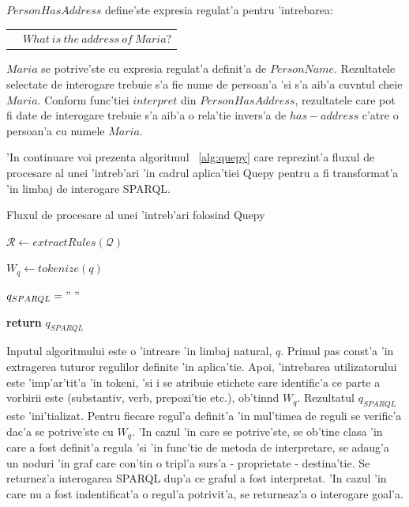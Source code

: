 \documentclass[12pt,a4paper,twoside]{report}
\begin{document}
$PersonHasAddress$ define'ste expresia regulat'a pentru 'intrebarea:

\begin{tabular}{ll}
 & $What\ is\ the\ address\ of\ Maria?$
\end{tabular}


$Maria$ se potrive'ste cu expresia regulat'a definit'a de $PersonName$. Rezultatele selectate de interogare trebuie s'a fie nume de persoan'a 'si s'a aib'a cuv\ia ntul cheie $Maria$. Conform func'tiei $interpret$ din $PersonHasAddress$, rezultatele care pot fi date de interogare trebuie s'a aib'a o rela'tie invers'a de $has-address$ c'atre o persoan'a cu numele $Maria$.

'In continuare voi prezenta algoritmul ~\ref{alg:quepy} care reprezint'a fluxul de procesare al unei 'intreb'ari 'in cadrul aplica'tiei Quepy pentru a fi transformat'a 'in limbaj de interogare SPARQL.

  
\begin{algorithm}
\caption{Fluxul de procesare al unei 'intreb'ari folosind Quepy}
\label{alg:quepy}
 
 
 $\mathcal{R} \leftarrow extractRules(\mathcal{Q})$\;
 
 $W_q \leftarrow tokenize(q)$\;
 
 $q_{SPARQL} = "\ "$\;

{        
\textbf{return} $q_{SPARQL}$
}
\end{algorithm}


Inputul algoritmului este o 'intreare 'in limbaj natural, $q$. Primul pas const'a 'in extragerea tuturor regulilor definite 'in aplica'tie. Apoi, 'intrebarea utilizatorului este 'imp'ar'tit'a 'in tokeni, 'si i se atribuie etichete care identific'a ce parte a vorbirii este (substantiv, verb, prepozi'tie etc.), ob'tin\ia nd $W_q$. Rezultatul $q_{SPARQL}$ este 'ini'tializat. Pentru fiecare regul'a definit'a 'in mul'timea de reguli se verific'a dac'a se potrive'ste cu $W_q$. 'In cazul 'in care se potrive'ste, se ob'tine clasa 'in care a fost definit'a regula 'si 'in func'tie de metoda de interpretare, se adaug'a un noduri 'in graf care con'tin o tripl'a surs'a - proprietate - destina'tie. Se returnez'a interogarea SPARQL dup'a ce graful a fost interpretat. 'In cazul 'in care nu a fost indentificat'a o regul'a potrivit'a, se returneaz'a o interogare goal'a.
\end{document}

